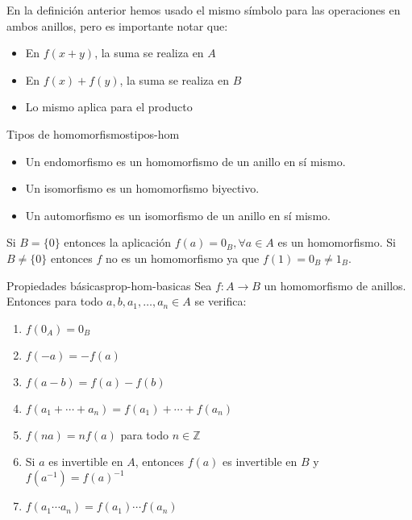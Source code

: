 \begin{remark}
    En la definición anterior hemos usado el mismo símbolo para las operaciones en ambos anillos, pero es importante notar que:
    \begin{itemize}
        \item En \(f(x + y)\), la suma se realiza en \(A\)
        \item En \(f(x) + f(y)\), la suma se realiza en \(B\)
        \item Lo mismo aplica para el producto
    \end{itemize}
\end{remark}

\begin{definition}{Tipos de homomorfismos}{tipos-hom}
    \begin{itemize}
        \item Un {endomorfismo} es un homomorfismo de un anillo en sí mismo.
        \item Un {isomorfismo} es un homomorfismo biyectivo.
        \item Un {automorfismo} es un isomorfismo de un anillo en sí mismo.
    \end{itemize}
\end{definition}

\begin{example}{}{}
    Si $B = \{0\}$ entonces la aplicación $f(a) = 0_B, \forall a \in A$ es un homomorfismo. Si $B \neq \{0\}$ entonces $f$ no es un homomorfismo ya que $f(1) = 0_B \neq 1_B$.
\end{example}

\begin{proposition}{Propiedades básicas}{prop-hom-basicas}
    Sea \(f: A \to B\) un homomorfismo de anillos. Entonces para todo \(a, b, a_1, \ldots, a_n \in A\) se verifica:
    \begin{enumerate}
        \item \(f(0_A) = 0_B\)
        \item \(f(-a) = -f(a)\)
        \item \(f(a - b) = f(a) - f(b)\)
        \item \(f(a_1 + \cdots + a_n) = f(a_1) + \cdots + f(a_n)\)
        \item \(f(na) = nf(a)\) para todo \(n \in \mathbb{Z}\)
        \item Si \(a\) es invertible en \(A\), entonces \(f(a)\) es invertible en \(B\) y \(f(a^{-1}) = f(a)^{-1}\)
        \item \(f(a_1 \cdots a_n) = f(a_1) \cdots f(a_n)\)
    \end{enumerate}
\end{proposition}

